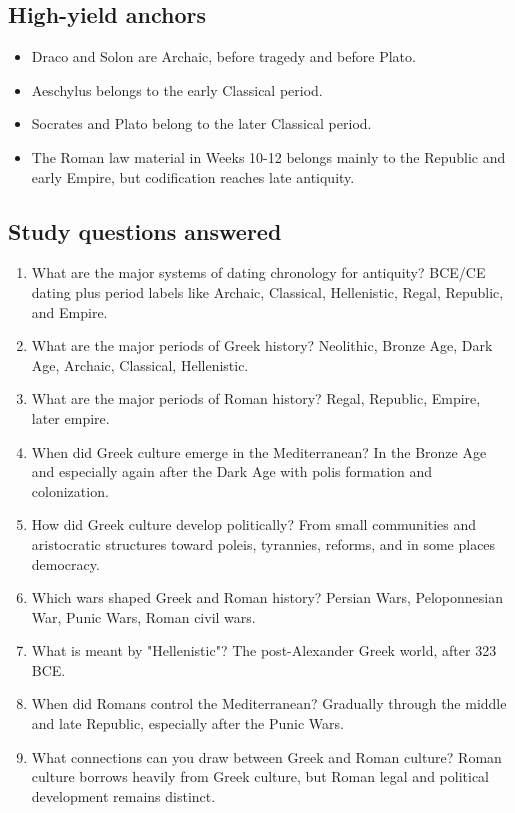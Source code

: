 \documentclass[11pt]{article}
\begin{document}
\subsection{High-yield anchors}

\begin{itemize}
\item Draco and Solon are Archaic, before tragedy and before Plato.
\item Aeschylus belongs to the early Classical period.
\item Socrates and Plato belong to the later Classical period.
\item The Roman law material in Weeks 10-12 belongs mainly to the Republic and early Empire, but codification reaches late antiquity.
\end{itemize}

\subsection{Study questions answered}

\begin{enumerate}
\item What are the major systems of dating chronology for antiquity? BCE/CE dating plus period labels like Archaic, Classical, Hellenistic, Regal, Republic, and Empire.
\item What are the major periods of Greek history? Neolithic, Bronze Age, Dark Age, Archaic, Classical, Hellenistic.
\item What are the major periods of Roman history? Regal, Republic, Empire, later empire.
\item When did Greek culture emerge in the Mediterranean? In the Bronze Age and especially again after the Dark Age with polis formation and colonization.
\item How did Greek culture develop politically? From small communities and aristocratic structures toward poleis, tyrannies, reforms, and in some places democracy.
\item Which wars shaped Greek and Roman history? Persian Wars, Peloponnesian War, Punic Wars, Roman civil wars.
\item What is meant by "Hellenistic"? The post-Alexander Greek world, after 323 BCE.
\item When did Romans control the Mediterranean? Gradually through the middle and late Republic, especially after the Punic Wars.
\item What connections can you draw between Greek and Roman culture? Roman culture borrows heavily from Greek culture, but Roman legal and political development remains distinct.
\end{enumerate}
\end{document}

